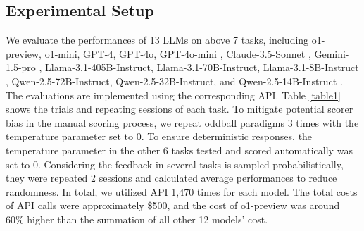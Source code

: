 \subsection{Experimental Setup}
We evaluate the performances of 13 LLMs on above 7 tasks, including o1-preview, o1-mini, GPT-4, GPT-4o, GPT-4o-mini \cite{ChatGPT}, Claude-3.5-Sonnet \cite{Claude}, Gemini-1.5-pro \cite{reid2024gemini}, Llama-3.1-405B-Instruct, Llama-3.1-70B-Instruct, Llama-3.1-8B-Instruct \cite{dubey2024llama}, Qwen-2.5-72B-Instruct, Qwen-2.5-32B-Instruct, and Qwen-2.5-14B-Instruct \cite{yang2024qwen2}. 
The evaluations are implemented using the corresponding API. 
Table \ref{table1} shows the trials and repeating sessions of each task. 
To mitigate potential scorer bias in the manual scoring process, we repeat oddball paradigms 3 times with the temperature parameter set to 0. 
To ensure deterministic responses, the temperature parameter in the other 6 tasks tested and scored automatically was set to 0. 
Considering the feedback in several tasks is sampled probabilistically, they were repeated 2 sessions and calculated average performances to reduce randomness. 
In total, we utilized API 1,470 times for each model. The total costs of API calls were approximately \$500, and the cost of o1-preview was around 60\% higher than the summation of all other 12 models' cost.
